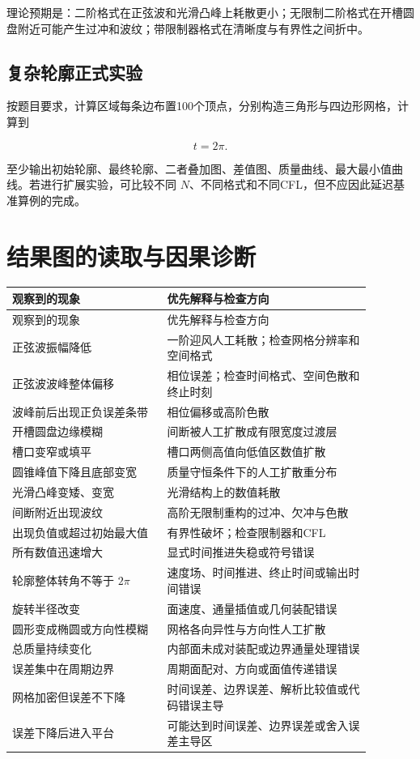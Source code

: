 \documentclass[UTF8,12pt,a4paper,fontset=fandol]{ctexart}
\numberwithin{equation}{section}
\begin{document}
理论预期是：二阶格式在正弦波和光滑凸峰上耗散更小；无限制二阶格式在开槽圆盘附近可能产生过冲和波纹；带限制器格式在清晰度与有界性之间折中。

\subsection{复杂轮廓正式实验}

按题目要求，计算区域每条边布置100个顶点，分别构造三角形与四边形网格，计算到

\begin{equation}
  t=2\pi.
\end{equation}

至少输出初始轮廓、最终轮廓、二者叠加图、差值图、质量曲线、最大最小值曲线。若进行扩展实验，可比较不同 $N$、不同格式和不同CFL，但不应因此延迟基准算例的完成。

\section{结果图的读取与因果诊断}

\begin{longtable}{L{0.38\linewidth}L{0.50\linewidth}}
\toprule
观察到的现象 & 优先解释与检查方向\\
\midrule
\endfirsthead
\toprule
观察到的现象 & 优先解释与检查方向\\
\midrule
\endhead
正弦波振幅降低 & 一阶迎风人工耗散；检查网格分辨率和空间格式\\
正弦波波峰整体偏移 & 相位误差；检查时间格式、空间色散和终止时刻\\
波峰前后出现正负误差条带 & 相位偏移或高阶色散\\
开槽圆盘边缘模糊 & 间断被人工扩散成有限宽度过渡层\\
槽口变窄或填平 & 槽口两侧高值向低值区数值扩散\\
圆锥峰值下降且底部变宽 & 质量守恒条件下的人工扩散重分布\\
光滑凸峰变矮、变宽 & 光滑结构上的数值耗散\\
间断附近出现波纹 & 高阶无限制重构的过冲、欠冲与色散\\
出现负值或超过初始最大值 & 有界性破坏；检查限制器和CFL\\
所有数值迅速增大 & 显式时间推进失稳或符号错误\\
轮廓整体转角不等于 $2\pi$ & 速度场、时间推进、终止时间或输出时间错误\\
旋转半径改变 & 面速度、通量插值或几何装配错误\\
圆形变成椭圆或方向性模糊 & 网格各向异性与方向性人工扩散\\
总质量持续变化 & 内部面未成对装配或边界通量处理错误\\
误差集中在周期边界 & 周期面配对、方向或面值传递错误\\
网格加密但误差不下降 & 时间误差、边界误差、解析比较值或代码错误主导\\
误差下降后进入平台 & 可能达到时间误差、边界误差或舍入误差主导区\\
\bottomrule
\end{longtable}
\end{document}
